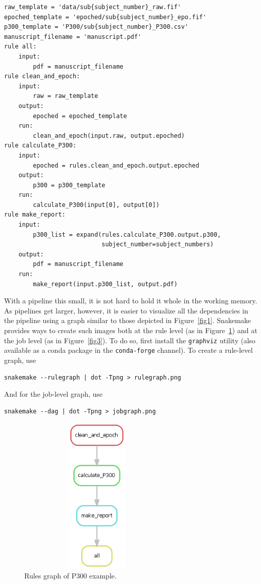 \documentclass[a4paper,man,floatsintext,natbib]{apa6}
\begin{document}
\begin{verbatim}
raw_template = 'data/sub{subject_number}_raw.fif'
epoched_template = 'epoched/sub{subject_number}_epo.fif'
p300_template = 'P300/sub{subject_number}_P300.csv'
manuscript_filename = 'manuscript.pdf'
rule all:
    input:
        pdf = manuscript_filename 
rule clean_and_epoch:
    input:
        raw = raw_template
    output:
        epoched = epoched_template
    run:
        clean_and_epoch(input.raw, output.epoched)
rule calculate_P300:
    input:
        epoched = rules.clean_and_epoch.output.epoched
    output:
        p300 = p300_template 
    run:
        calculate_P300(input[0], output[0])
rule make_report:
    input:
        p300_list = expand(rules.calculate_P300.output.p300,
                           subject_number=subject_numbers)   
    output:
        pdf = manuscript_filename
    run:
        make_report(input.p300_list, output.pdf)
\end{verbatim}

With a pipeline this small, it is not hard to hold it whole in the working memory. As pipelines get larger, however, it is easier to visualize all the dependencies in the pipeline using a graph similar to those depicted in Figure~\ref{fig1}. Snakemake provides ways to create such images both at the rule level (as in Figure~\ref{fig2}) and at the job level (as in Figure~\ref{fig3}). To do so, first install the \verb|graphviz| utility (also available as a conda package in the \verb|conda-forge| channel). To create a rule-level graph, use

\begin{verbatim}
snakemake --rulegraph | dot -Tpng > rulegraph.png
\end{verbatim}

And for the job-level graph, use

\begin{verbatim}
snakemake --dag | dot -Tpng > jobgraph.png
\end{verbatim}

\begin{figure}
\centering
\captionsetup{justification=centering}
\includegraphics[height=3in,width=3in,keepaspectratio]{pictures/Snakemake_rulegraph.png}
\caption{Rules graph of P300 example.} \label{fig2}
\end{figure}
\end{document}
